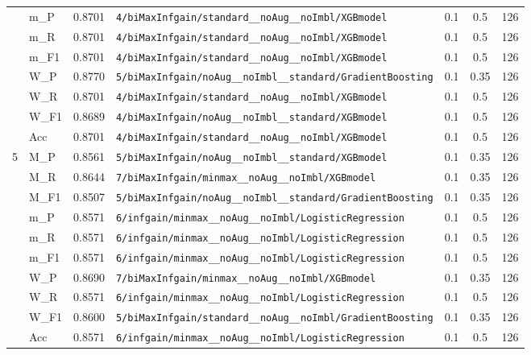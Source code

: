\begin{table}[htbp]
\begin{tabular}{|c|l|c|>{\ttfamily\footnotesize}p{7.2cm}|c|c|c|}
 & m\_P & 0.8701 & \texttt{4/biMaxInfgain/standard\_\_noAug\_\_noImbl/XGBmodel} & 0.1 & 0.5  & 126 \\ 
 & m\_R & 0.8701 & \texttt{4/biMaxInfgain/standard\_\_noAug\_\_noImbl/XGBmodel} & 0.1 & 0.5  & 126 \\ 
 & m\_F1 & 0.8701 & \texttt{4/biMaxInfgain/standard\_\_noAug\_\_noImbl/XGBmodel} & 0.1 & 0.5  & 126 \\ 
 & W\_P & 0.8770 & \texttt{5/biMaxInfgain/noAug\_\_noImbl\_\_standard/GradientBoosting} & 0.1 & 0.35  & 126 \\ 
 & W\_R & 0.8701 & \texttt{4/biMaxInfgain/standard\_\_noAug\_\_noImbl/XGBmodel} & 0.1 & 0.5  & 126 \\ 
 & W\_F1 & 0.8689 & \texttt{4/biMaxInfgain/noAug\_\_noImbl\_\_standard/XGBmodel} & 0.1 & 0.5  & 126 \\ 
 & Acc & 0.8701 & \texttt{4/biMaxInfgain/standard\_\_noAug\_\_noImbl/XGBmodel} & 0.1 & 0.5  & 126 \\ 
\hline
\multirow{10}{*}{5} & M\_P & 0.8561 & \texttt{5/biMaxInfgain/noAug\_\_noImbl\_\_standard/XGBmodel} & 0.1 & 0.35  & 126 \\ 
 & M\_R & 0.8644 & \texttt{7/biMaxInfgain/minmax\_\_noAug\_\_noImbl/XGBmodel} & 0.1 & 0.35  & 126 \\ 
 & M\_F1 & 0.8507 & \texttt{5/biMaxInfgain/noAug\_\_noImbl\_\_standard/GradientBoosting} & 0.1 & 0.35  & 126 \\ 
 & m\_P & 0.8571 & \texttt{6/infgain/minmax\_\_noAug\_\_noImbl/LogisticRegression} & 0.1 & 0.5  & 126 \\ 
 & m\_R & 0.8571 & \texttt{6/infgain/minmax\_\_noAug\_\_noImbl/LogisticRegression} & 0.1 & 0.5  & 126 \\ 
 & m\_F1 & 0.8571 & \texttt{6/infgain/minmax\_\_noAug\_\_noImbl/LogisticRegression} & 0.1 & 0.5  & 126 \\ 
 & W\_P & 0.8690 & \texttt{7/biMaxInfgain/minmax\_\_noAug\_\_noImbl/XGBmodel} & 0.1 & 0.35  & 126 \\ 
 & W\_R & 0.8571 & \texttt{6/infgain/minmax\_\_noAug\_\_noImbl/LogisticRegression} & 0.1 & 0.5  & 126 \\ 
 & W\_F1 & 0.8600 & \texttt{5/biMaxInfgain/standard\_\_noAug\_\_noImbl/GradientBoosting} & 0.1 & 0.35  & 126 \\ 
 & Acc & 0.8571 & \texttt{6/infgain/minmax\_\_noAug\_\_noImbl/LogisticRegression} & 0.1 & 0.5  & 126 \\ 
\hline
\end{tabular}
\end{table}